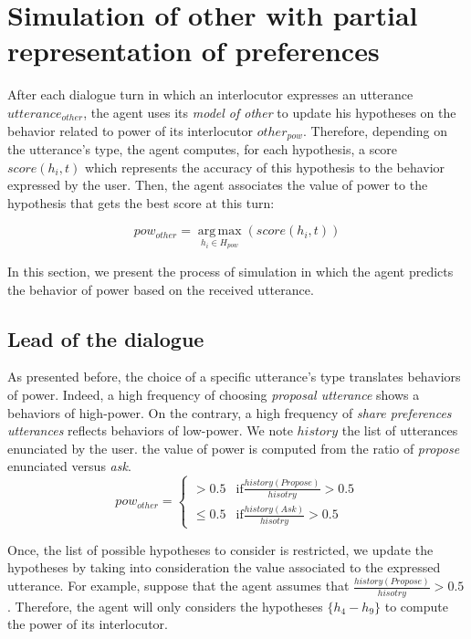 \documentclass[conference, letterpaper]{IEEEtran}
\begin{document}
	\section{Simulation of other with partial representation of preferences}
	\label{sec:simulation}
		After each dialogue turn in which an interlocutor expresses an utterance $utterance_{other}$, the agent uses its \emph{model of other} to update his hypotheses on the behavior related to power of its interlocutor $other_{pow}$. 
		Therefore, depending on the utterance's type, the agent computes, for each hypothesis, a score $score(h_i,t)$ which represents the accuracy of this hypothesis to the behavior expressed by the user. Then, the agent associates the value of power to the hypothesis that gets the best score at this turn:
			
			\begin{equation}
			pow_{other} = \operatorname*{arg\,max}_{h_i \in H_{pow}} (score(h_i,t))
			\end{equation}
		
	In this section, we present the process of simulation in which the agent predicts the behavior of power based on the received utterance. 
		
		\subsection{Lead of the dialogue}		
		As presented before, the choice of a specific utterance's type translates behaviors of power. Indeed, a high frequency of choosing \emph{proposal utterance} shows a behaviors of high-power. On the contrary, a high frequency of \emph{share preferences utterances} reflects behaviors of low-power.
		We note $history$ the list of utterances enunciated by the user. the value of power is computed from the ratio of \textit{propose} enunciated versus \textit{ask}.
		\begin{equation}
		pow_{other} = \left\{\begin{array}{ll}
		> 0.5 & \mathrm{if } \frac{history(Propose)}{hisotry} > 0.5\\
		\leq 0.5 & \mathrm{if  } \frac{history(Ask)}{hisotry} > 0.5
		\end{array}\right.
		\end{equation}
		
		Once, the list of possible hypotheses to consider is restricted, we update the hypotheses by taking into consideration the value associated to the expressed utterance.
		For example, suppose that the agent assumes that $\frac{history(Propose)}{hisotry} > 0.5$. Therefore, the agent will only considers the hypotheses $\{h_4 - h_9\}$ to compute the power of its interlocutor.
		
\end{document}
